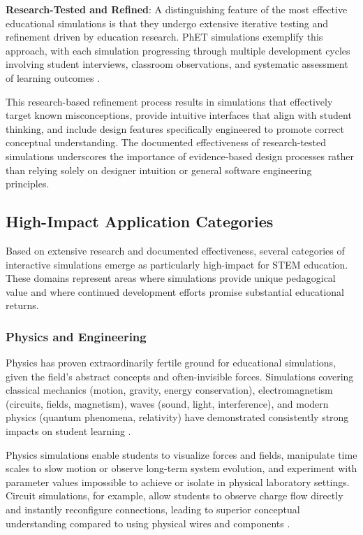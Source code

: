 \textbf{Research-Tested and Refined}: A distinguishing feature of the most effective educational simulations is that they undergo extensive iterative testing and refinement driven by education research. PhET simulations exemplify this approach, with each simulation progressing through multiple development cycles involving student interviews, classroom observations, and systematic assessment of learning outcomes \cite{phet2023}.

This research-based refinement process results in simulations that effectively target known misconceptions, provide intuitive interfaces that align with student thinking, and include design features specifically engineered to promote correct conceptual understanding. The documented effectiveness of research-tested simulations underscores the importance of evidence-based design processes rather than relying solely on designer intuition or general software engineering principles.

\subsection{High-Impact Application Categories}

Based on extensive research and documented effectiveness, several categories of interactive simulations emerge as particularly high-impact for STEM education. These domains represent areas where simulations provide unique pedagogical value and where continued development efforts promise substantial educational returns.

\subsubsection{Physics and Engineering}

Physics has proven extraordinarily fertile ground for educational simulations, given the field's abstract concepts and often-invisible forces. Simulations covering classical mechanics (motion, gravity, energy conservation), electromagnetism (circuits, fields, magnetism), waves (sound, light, interference), and modern physics (quantum phenomena, relativity) have demonstrated consistently strong impacts on student learning \cite{wieman2008phet, finkelstein2005phet}.

Physics simulations enable students to visualize forces and fields, manipulate time scales to slow motion or observe long-term system evolution, and experiment with parameter values impossible to achieve or isolate in physical laboratory settings. Circuit simulations, for example, allow students to observe charge flow directly and instantly reconfigure connections, leading to superior conceptual understanding compared to using physical wires and components \cite{finkelstein2005phet}.

